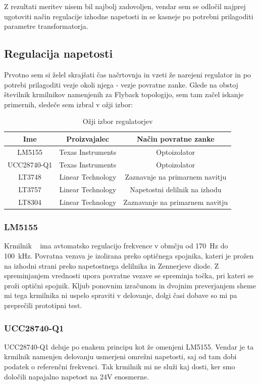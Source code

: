 \documentclass[a4paper,twoside,openright,12pt,slovene]{book}
\begin{document}
Z rezultati meritev nisem bil najbolj zadovoljen, vendar sem se odločil najprej ugotoviti način regulacije izhodne napetosti in se kasneje po potrebni prilagoditi parametre transformatorja. 

	\subsection{Regulacija napetosti} \label{RegulacijaNapetosti}
	Prvotno sem si želel skrajšati čas načrtovnja in vzeti že narejeni regulator in po potrebi prilagoditi vezje okoli njega - vezje povratne zanke. Glede na obstoj številnik krmilnikov namenjenih za Flyback topologijo, sem tam začel iskanje primernih, sledeče sem izbral v ožji izbor:
	
\begin{table}[h!]
\centering
\begin{tabular}{||c | c |c||}
\hline
Ime & Proizvajalec & Način povratne zanke \\[0.5ex]
\hline\hline
LM5155 & Texas Instruments & Optoizolator \\
UCC28740-Q1 & Texas Instruments & Optoizolator \\
LT3748 & Linear Technology & Zaznavnje na primarnem navitju \\
LT3757 & Linear Technology & Napetostni delilnik na izhodu \\
LT8304 & Linear Technology & Zaznavanje na primarnem navitju \\ [1ex]

\hline
\end{tabular}
\caption{Ožji izbor regulatorjev}
\end{table}

	\subsubsection{LM5155} \label{LM5155}
Krmilnik ~\cite{TI:LT5155} ima avtomatsko regulacijo frekvence v obmčju od \SI{170}{\hertz} do \SI{100}{\kilo\hertz}. Povratna vezava je izolirana preko optičnega spojnika, kateri je prožen na izhodni strani preko napetostnega delilnika in Zennerjeve diode. Z spreminjanjem vrednosti upora povratne vezave se spreminja točka, pri kateri se proži optični spojnik. Kljub ponovnim izračunom in dvojnim preverjanjem sheme mi tega krmilnika ni uspelo spraviti v delovanje, dolgi časi dobave so mi pa preprečili prototipni test.


	\subsubsection{UCC28740-Q1} \label{UCC28740-Q1}
UCC28740-Q1 deluje po enakem principu kot že omenjeni LM5155. Vendar je ta krmilnik namenjen delovanju usmerjeni omrežni napetosti, saj od tam dobi podatek o referenčni frekvenci. Tak krmilnik mi ne služi kaj dosti, ker smo določili napajalno napetost na 24V enosmerne. 
\end{document}

